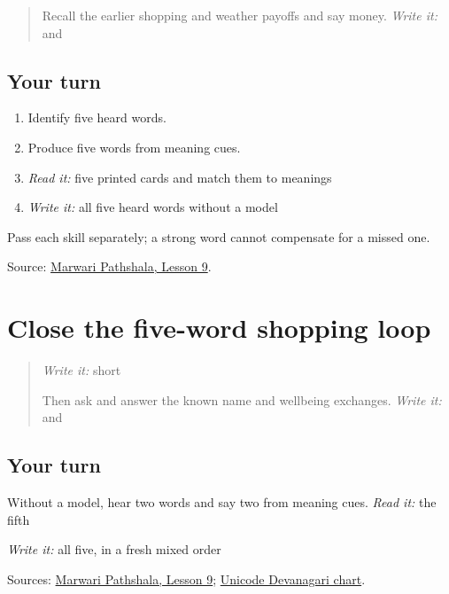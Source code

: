 \label{lesson:MW-C14-shopping-five}



\begin{quote}
Recall the earlier shopping and weather payoffs and say money. \emph{Write it:} \textbf{} and \textbf{}
\end{quote}

\subsection*{Your turn}
\begin{enumerate}
\raggedright
  \item Identify five heard words.
  \item Produce five words from meaning cues.
  \item \emph{Read it:} five printed cards and match them to meanings
  \item \emph{Write it:} all five heard words without a model
\end{enumerate}

Pass each skill separately; a strong word cannot compensate for a missed one.

\begin{tcolorbox}[breakable,colback=teal!4,colframe=teal!35!black,title={Before you move on}]
Source: \href{https://www.marwaripathshala.com/marwari-lesson-9-english}{Marwari Pathshala, Lesson 9}.
\end{tcolorbox}
\section[Practice]{Close the five-word shopping loop}

\label{lesson:MW-R14-shopping-close}



\begin{quote}
\emph{Write it:} short \textbf{}

Then ask and answer the known name and wellbeing exchanges. \emph{Write it:} \textbf{} and \textbf{}
\end{quote}

\subsection*{Your turn}
Without a model, hear two words and say two from meaning cues. \emph{Read it:} the fifth

\emph{Write it:} all five, in a fresh mixed order

\begin{tcolorbox}[breakable,colback=teal!4,colframe=teal!35!black,title={Before you move on}]
Sources: \href{https://www.marwaripathshala.com/marwari-lesson-9-english}{Marwari Pathshala, Lesson 9}; \href{https://www.unicode.org/charts/PDF/U0900.pdf}{Unicode Devanagari chart}.
\end{tcolorbox}
